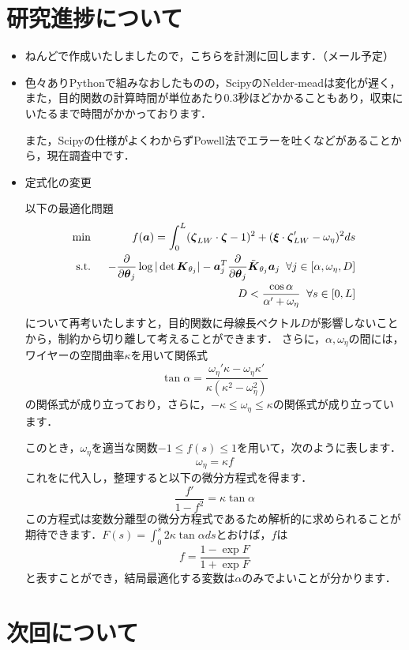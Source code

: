 \documentclass[11pt]{jsarticle}
\begin{document}
	\section{研究進捗について}
		\begin{itemize}
			\item ねんどで作成いたしましたので，こちらを計測に回します．（メール予定）
			\item 色々ありPythonで組みなおしたものの，ScipyのNelder-meadは変化が遅く，また，目的関数の計算時間が単位あたり0.3秒ほどかかることもあり，収束にいたるまで時間がかかっております．
			
			また，Scipyの仕様がよくわからずPowell法でエラーを吐くなどがあることから，現在調査中です．
			\item 定式化の変更
			
			以下の最適化問題
			\begin{eqnarray}
				\min \;\; &&f(\boldsymbol{a}) = \int_{0}^{L} (\boldsymbol{\zeta}_{LW} \cdot \boldsymbol{\zeta} -1 )^2 + (\boldsymbol{\xi} \cdot \boldsymbol{\zeta}_{LW}' - \omega_{\eta})^2 ds  \\
				\mathrm{s.t.} \;\;&& -\frac{\partial }{\partial \boldsymbol{\theta}_{j}}\log|\det \boldsymbol{K}_{\theta_{j}}| - \boldsymbol{a}_j^T \frac{\partial }{\partial \boldsymbol{\theta}_{j}} \tilde{\boldsymbol{K}}_{\theta_{j}} \boldsymbol{a}_j \;\; \forall j \in [\alpha,\omega_{\eta},D] \\
				&& D<\frac{\cos \alpha}{\alpha'+\omega_{\eta}} \;\; \forall s \in [0,L]
			\end{eqnarray}
			について再考いたしますと，目的関数に母線長ベクトル$ D $が影響しないことから，制約から切り離して考えることができます．
			さらに，$ \alpha,\omega_{\eta} $の間には，ワイヤーの空間曲率$ \kappa $を用いて関係式
			\begin{equation}\label{eq:omgEta_and_alpha}
				\tan \alpha = \frac{\omega_{\eta}' \kappa - \omega_{\eta} \kappa'}{\kappa (\kappa^2 - \omega_{\eta}^2)}
			\end{equation}
			の関係式が成り立っており，さらに，$ -\kappa \leq \omega_{\eta} \leq \kappa $の関係式が成り立っています．
			
			このとき，$ \omega_{\eta} $を適当な関数$ -1 \leq f(s)  \leq 1$を用いて，次のように表します．
			\begin{equation}\label{eq:feq}
				\omega_{\eta} = \kappa f
			\end{equation}
			これをに代入し，整理すると以下の微分方程式を得ます．
			\begin{equation}\label{eq:f_ode}
				\frac{f'}{1-f^2} = \kappa \tan \alpha
			\end{equation}
			この方程式は変数分離型の微分方程式であるため解析的に求められることが期待できます．$ F(s) = \int_{0}^{s} 2 \kappa \tan \alpha ds$とおけば，$ f $は
			\begin{equation}\label{eq:f_solve}
				f = \frac{1-\exp F}{1+\exp F}
			\end{equation}
			と表すことができ，結局最適化する変数は$ \alpha $のみでよいことが分かります．
		\end{itemize}
	\section{次回について}
		
	\newpage
\vspace{10cm}
	

\vspace{14cm}
	\articleSPRfour
	\articleSPRfive
\end{document}
